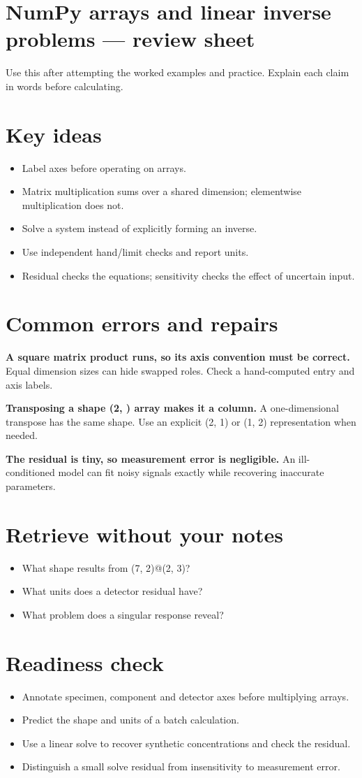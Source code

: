 \documentclass[11pt,letterpaper]{article}
\theoremstyle{definition}\newtheorem{definition}{Definition}\newtheorem{example}{Example}
\numberwithin{equation}{section}
\begin{document}
\section*{NumPy arrays and linear inverse problems --- review sheet}
Use this after attempting the worked examples and practice. Explain each claim in words before calculating.

\section*{Key ideas}
\begin{itemize}
\item Label axes before operating on arrays.
\item Matrix multiplication sums over a shared dimension; elementwise multiplication does not.
\item Solve a system instead of explicitly forming an inverse.
\item Use independent hand/limit checks and report units.
\item Residual checks the equations; sensitivity checks the effect of uncertain input.
\end{itemize}
\section*{Common errors and repairs}
\textbf{A square matrix product runs, so its axis convention must be correct.} Equal dimension sizes can hide swapped roles. Check a hand-computed entry and axis labels.

\textbf{Transposing a shape (2, ) array makes it a column.} A one-dimensional transpose has the same shape. Use an explicit (2, 1) or (1, 2) representation when needed.

\textbf{The residual is tiny, so measurement error is negligible.} An ill-conditioned model can fit noisy signals exactly while recovering inaccurate parameters.

\section*{Retrieve without your notes}
\begin{itemize}
\item What shape results from (7, 2)@(2, 3)?
\item What units does a detector residual have?
\item What problem does a singular response reveal?
\end{itemize}
\section*{Readiness check}
\begin{itemize}
\item Annotate specimen, component and detector axes before multiplying arrays.
\item Predict the shape and units of a batch calculation.
\item Use a linear solve to recover synthetic concentrations and check the residual.
\item Distinguish a small solve residual from insensitivity to measurement error.
\end{itemize}
\end{document}
